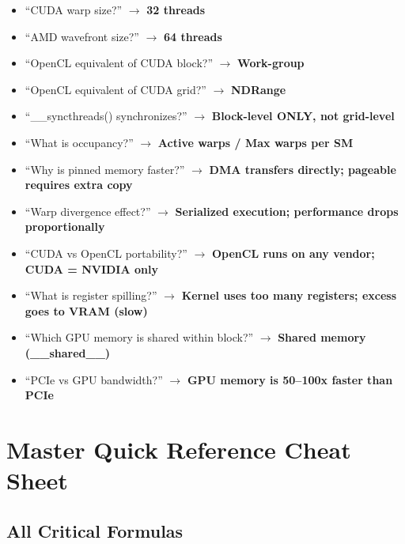 \documentclass[11pt,a4paper]{article}
\newcommand{\highlight}[1]{\colorbox{yellow!50}{\textbf{#1}}}
\begin{document}
\begin{mcqtrap}
\begin{itemize}[noitemsep]
  \item ``CUDA warp size?'' $\to$ \highlight{32 threads}
  \item ``AMD wavefront size?'' $\to$ \highlight{64 threads}
  \item ``OpenCL equivalent of CUDA block?'' $\to$ \highlight{Work-group}
  \item ``OpenCL equivalent of CUDA grid?'' $\to$ \highlight{NDRange}
  \item ``\_\_syncthreads() synchronizes?'' $\to$ \highlight{Block-level ONLY, not grid-level}
  \item ``What is occupancy?'' $\to$ \highlight{Active warps / Max warps per SM}
  \item ``Why is pinned memory faster?'' $\to$ \highlight{DMA transfers directly; pageable requires extra copy}
  \item ``Warp divergence effect?'' $\to$ \highlight{Serialized execution; performance drops proportionally}
  \item ``CUDA vs OpenCL portability?'' $\to$ \highlight{OpenCL runs on any vendor; CUDA = NVIDIA only}
  \item ``What is register spilling?'' $\to$ \highlight{Kernel uses too many registers; excess goes to VRAM (slow)}
  \item ``Which GPU memory is shared within block?'' $\to$ \highlight{Shared memory (\_\_shared\_\_)}
  \item ``PCIe vs GPU bandwidth?'' $\to$ \highlight{GPU memory is 50--100x faster than PCIe}
\end{itemize}
\end{mcqtrap}

\section{Master Quick Reference Cheat Sheet}

\subsection{All Critical Formulas}
\end{document}
